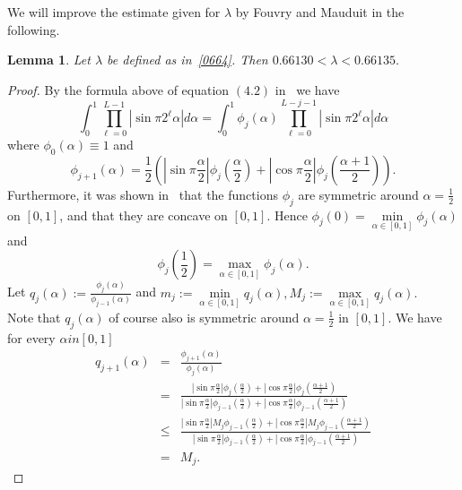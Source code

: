 \documentclass[12pt]{amsart}
\newtheorem{lemma}{Lemma}
\begin{document}
We will improve the estimate given for $\lambda$ by Fouvry and Mauduit in the following.
\begin{lemma} \label{lem7}
Let $\lambda$ be defined as in~\eqref{0664}. Then $0.66130 < \lambda < 0.66135.$
\end{lemma}
\begin{proof}
By the formula above of equation $(4.2)$ in~\cite{foumau} we have 
$$
\int^{1}_{0} \prod^{L-1}_{\ell=0} \left|\sin \pi 2^{\ell} \alpha \right|d\alpha = \int^{1}_{0} \phi_{j} (\alpha) \prod^{L-j-1}_{\ell=0} \left|\sin \pi 2^{\ell} \alpha\right| d\alpha
$$
where $\phi_{0} (\alpha) \equiv 1$ and
$$
\phi_{j+1} (\alpha) = \frac{1}{2} \left(\left|\sin \pi \frac{\alpha}{2}\right| \phi_{j} \left(\frac{\alpha}{2}\right) + \left|\cos \pi \frac{\alpha}{2}\right| \phi_{j} \left(\frac{\alpha+1}{2}\right)\right).
$$
Furthermore, it was shown in~\cite{foumau} that the functions $\phi_{j}$ are symmetric around $\alpha= \frac{1}{2}$ on $\left[0,1\right]$, and that they are concave on $\left[0,1\right]$. Hence $\phi_{j}(0)= \underset{\alpha \in \left[0,1\right]}{\min} \phi_{j} (\alpha)$ and
$$
\phi_{j} \left(\frac{1}{2}\right) = \underset{\alpha \in \left[0,1\right]}{\max} \phi_{j} (\alpha).
$$
Let $q_{j} (\alpha) := \frac{\phi_{j} (\alpha)}{\phi_{j-1} (\alpha)}$ and $m_{j} := \underset{\alpha \in \left[0,1\right]}{\min} q_{j} (\alpha), M_{j} := \underset{\alpha \in \left[0,1\right]}{\max} q_{j} (\alpha).$\\
Note that $q_{j} (\alpha)$ of course also is symmetric around $\alpha=\frac{1}{2}$ in $\left[0,1\right]$. We have for every $\alpha in [0,1]$
\begin{eqnarray*}
q_{j+1} (\alpha) & = & \frac{\phi_{j+1} (\alpha)}{\phi_{j} (\alpha)} \\
& = & \frac{\left|\sin \pi \frac{\alpha}{2}\right| \phi_{j} \left(\frac{\alpha}{2}\right) + \left|\cos \pi \frac{\alpha}{2}\right| \phi_{j} \left(\frac{\alpha+1}{2}\right)}{\left|\sin \pi \frac{\alpha}{2}\right| \phi_{j-1} \left(\frac{\alpha}{2}\right) + \left|\cos \pi \frac{\alpha}{2}\right| \phi_{j-1} \left(\frac{\alpha+1}{2}\right)}  \\
& \leq & \frac{\left|\sin \pi \frac{\alpha}{2}\right|M_{j} \phi_{j-1} \left(\frac{\alpha}{2}\right)+ \left|\cos \pi \frac{\alpha}{2}\right| M_{j} \phi_{j-1} \left(\frac{\alpha+1}{2}\right)}{\left|\sin \pi \frac{\alpha}{2}\right| \phi_{j-1} \left(\frac{\alpha}{2}\right) + \left|\cos \pi \frac{\alpha}{2}\right| \phi_{j-1} \left(\frac{\alpha+1}{2}\right)} \\
& = & M_{j}.
\end{eqnarray*}

\end{proof}
\end{document}
